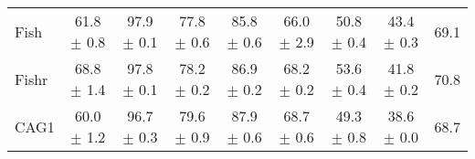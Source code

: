 \documentclass{article}
\begin{document}
\begin{center}
{\begin{tabular}{lcccccccc}
Fish                      & 61.8 $\pm$ 0.8            & 97.9 $\pm$ 0.1            & 77.8 $\pm$ 0.6            & 85.8 $\pm$ 0.6            & 66.0 $\pm$ 2.9            & 50.8 $\pm$ 0.4            & 43.4 $\pm$ 0.3            & 69.1                      \\
Fishr                     & 68.8 $\pm$ 1.4            & 97.8 $\pm$ 0.1            & 78.2 $\pm$ 0.2            & 86.9 $\pm$ 0.2            & 68.2 $\pm$ 0.2            & 53.6 $\pm$ 0.4            & 41.8 $\pm$ 0.2            & 70.8                      \\
\midrule
CAG1                      & 60.0 $\pm$ 1.2            & 96.7 $\pm$ 0.3            & 79.6 $\pm$ 0.9            & 87.9 $\pm$ 0.6            & 68.7 $\pm$ 0.6            & 49.3 $\pm$ 0.8            & 38.6 $\pm$ 0.0            & 68.7                      \\
\bottomrule
\end{tabular}}
\end{center}
\end{document}
